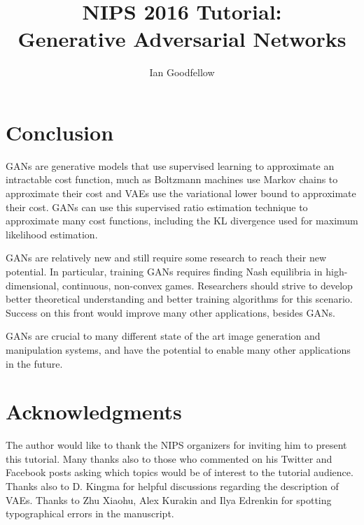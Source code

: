 \documentclass[]{article}
\title{NIPS 2016 Tutorial:\\ Generative Adversarial Networks}
\author{Ian Goodfellow}
\affil{OpenAI, {\tt ian@openai.com}}
\date{}
\DeclareRobustCommand{\[}{\begin{equation}}
\DeclareRobustCommand{\]}{\end{equation}}
\begin{document}
\newlength{\figwidth}
\setlength{\figwidth}{26pc}

\maketitle












\section{Conclusion}

GANs are generative models that use supervised learning to approximate an intractable cost
function, much as Boltzmann machines use Markov chains to approximate their cost and VAEs
use the variational lower bound to approximate their cost.
GANs can use this supervised ratio estimation technique to approximate many cost functions, including the KL divergence used for maximum
likelihood estimation.

GANs are relatively new and still require some research to reach their new potential.
In particular, training GANs requires finding Nash equilibria in high-dimensional,
continuous, non-convex games.
Researchers should strive to develop better theoretical understanding and better training
algorithms for this scenario.
Success on this front would improve many other applications, besides GANs.

GANs are crucial to many different state of the art image generation and manipulation systems,
and have the potential to enable many other applications in the future.

\section*{Acknowledgments}
The author would like to thank the NIPS organizers for inviting him to
present this tutorial.
Many thanks also to those who commented on his Twitter and Facebook posts
asking which topics would be of interest to the tutorial audience.
Thanks also to D. Kingma for helpful discussions regarding the description of VAEs.
Thanks to Zhu Xiaohu, Alex Kurakin and Ilya Edrenkin for spotting typographical errors in the
manuscript.



\end{document}
